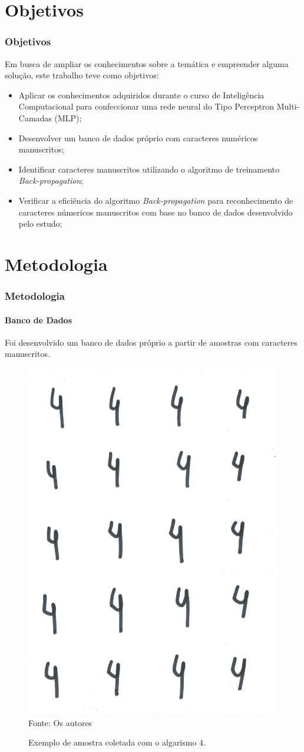 \section{Objetivos}
	\begin{frame}
	\frametitle{Objetivos}
	Em busca de ampliar os conhecimentos sobre a temática e empreender alguma solução, este trabalho teve como objetivos:
	\begin{itemize}
		\item Aplicar os conhecimentos adquiridos durante o curso de Inteligência Computacional para confeccionar uma rede neural do Tipo Perceptron Multi-Camadas (MLP);
		\item Desenvolver um banco de dados próprio com caracteres numéricos manuscritos;
		\item Identificar caracteres manuscritos utilizando o algoritmo de treinamento \textit{Back-propagation};
		\item Verificar a eficiência do algoritmo \textit{Back-propagation} para reconhecimento de caracteres númericos manuscritos com base no banco de dados desenvolvido pelo estudo;
	\end{itemize}
	\end{frame}

	\section{Metodologia}
	

	\begin{frame}
	\frametitle{Metodologia}
	\framesubtitle{Banco de Dados}
	Foi desenvolvido um banco de dados próprio a partir de amostras com caracteres manuscritos.
		\begin{figure}
		\centering
		\caption{Exemplo de amostra coletada com o algarismo 4.}
		\includegraphics[width=.17\linewidth]{quatro1.jpg}\\
		{\scriptsize Fonte: Os autores}
		\label{figtextimg}
	\end{figure} 
	\end{frame}


